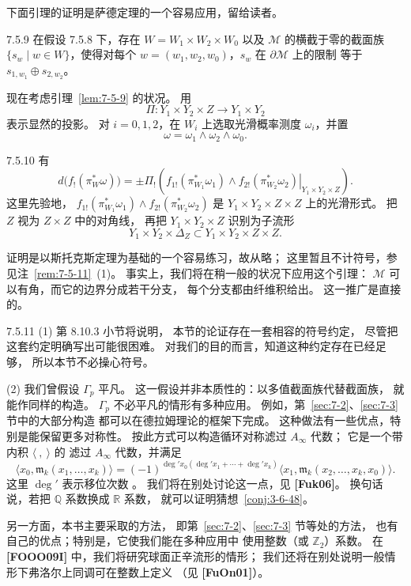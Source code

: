 下面引理的证明是萨德定理的一个容易应用，留给读者。

\begin{lemma}{7.5.9}\label{lem:7-5-9}
在假设 7.5.8 下，存在
$W=W_1\times W_2\times W_0$
以及 $\mathcal M$ 的横截于零的截面族
$\{s_w\mid w\in W\}$，使得对每个
$w=(w_1,w_2,w_0)$，$s_w$ 在 $\partial\mathcal M$ 上的限制
等于 $s_{1,w_1}\oplus s_{2,w_2}$。
\end{lemma}

现在考虑引理~\ref{lem:7-5-9} 的状况。
用
\[
\Pi\colon Y_1\times Y_2\times Z
\longrightarrow Y_1\times Y_2
\]
表示显然的投影。
对 $i=0,1,2$，在 $W_i$ 上选取光滑概率测度
$\omega_i$，并置
\[
\omega=\omega_1\wedge\omega_2\wedge\omega_0.
\]

\begin{lemma}{7.5.10}\label{lem:7-5-10}
有
\[
d\bigl(f_!(\pi_W^*\omega)\bigr)
=\mathord\pm\Pi_!\left(
\left.
f_{1!}(\pi_{W_1}^*\omega_1)
\wedge
f_{2!}(\pi_{W_2}^*\omega_2)
\right|_{Y_1\times Y_2\times Z}
\right).
\]
这里先验地，
$f_{1!}(\pi_{W_1}^*\omega_1)
\wedge f_{2!}(\pi_{W_2}^*\omega_2)$
是 $Y_1\times Y_2\times Z\times Z$ 上的光滑形式。
把 $Z$ 视为 $Z\times Z$ 中的对角线，
再把 $Y_1\times Y_2\times Z$ 识别为子流形
\[
Y_1\times Y_2\times\Delta_Z
\subset Y_1\times Y_2\times Z\times Z.
\]
\end{lemma}

证明是以斯托克斯定理为基础的一个容易练习，故从略；
这里暂且不计符号，参见注~\ref{rem:7-5-11}~(1)。
事实上，我们将在稍一般的状况下应用这个引理：
$\mathcal M$ 可以有角，而它的边界分成若干分支，
每个分支都由纤维积给出。
这一推广是直接的。

\begin{remark}{7.5.11}\label{rem:7-5-11}
\textup{(1)} 第 8.10.3 小节将说明，
本节的论证存在一套相容的符号约定，
尽管把这套约定明确写出可能很困难。
对我们的目的而言，知道这种约定存在已经足够，
所以本节不必操心符号。

\textup{(2)} 我们曾假设 $\Gamma_p$ 平凡。
这一假设并非本质性的：以多值截面族代替截面族，
就能作同样的构造。
$\Gamma_p$ 不必平凡的情形有多种应用。
例如，第~\ref{sec:7-2}、\ref{sec:7-3} 节中的大部分构造
都可以在德拉姆理论的框架下完成。
这种做法有一些优点，特别是能保留更多对称性。
按此方式可以构造循环对称滤过 $A_\infty$ 代数；
它是一个带内积 $\langle\ ,\ \rangle$ 的
滤过 $A_\infty$ 代数，并满足
\[
\bigl\langle x_0,\mathfrak m_k(x_1,\ldots,x_k)\bigr\rangle
=(-1)^{\deg' x_0(\deg' x_1+\cdots+\deg' x_k)}
\bigl\langle x_1,
\mathfrak m_k(x_2,\ldots,x_k,x_0)\bigr\rangle.
\]
这里 $\deg'$ 表示移位次数
。
我们将在别处讨论这一点，见 \textbf{[Fuk06]}。
换句话说，若把 $\mathbb Q$ 系数换成 $\mathbb R$ 系数，
就可以证明猜想~\ref{conj:3-6-48}。

另一方面，本书主要采取的方法，
即第~\ref{sec:7-2}、\ref{sec:7-3} 节等处的方法，
也有自己的优点；特别是，它使我们能在多种应用中
使用整数（或 $\mathbb Z_2$）系数。
在 \textbf{[FOOO09I]} 中，我们将研究球面正辛流形的情形；
我们还将在别处说明一般情形下弗洛尔上同调可在整数上定义
（见 \textbf{[FuOn01]}）。
\end{remark}
